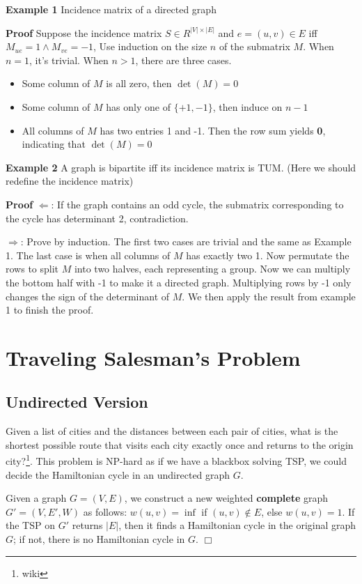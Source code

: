 \documentclass[11pt]{article}
\newenvironment{proof}{\vspace{-0.05in}\noindent{\bf Proof:}}%
        {\hspace*{\fill}$\Box$\par}
\begin{document}
    \textbf{Example 1} Incidence matrix of a directed graph 

    \textbf{Proof} Suppose the incidence matrix $S \in R ^{|V| \times |E|}$ and  $e = (u, v) \in E$ iff $M_{ue} = 1 \land M_{ve} = -1 $, Use induction on the size $n$ of the submatrix $M$. When $n = 1$, it's trivial. When $n > 1$, there are three cases.  
      \begin{itemize}
        \item Some column of $M$ is all zero, then $\det(M) = 0$
        \item Some column of $M$ has only one of $\{+1, -1\}$, then induce on $n - 1$
        \item All columns of $M$ has two entries 1 and -1. Then the row sum yields \textbf{0}, indicating that $\det(M) = 0$
      \end{itemize}

    \textbf{Example 2} A graph is bipartite iff its incidence matrix is TUM. (Here we should redefine the incidence matrix)

    \textbf{Proof} 
    $\Leftarrow$: If the graph contains an odd cycle, the submatrix corresponding to the cycle has determinant 2, contradiction.

    $\Rightarrow$: Prove by induction. The first two cases are trivial and the same as Example 1. The last case is when all columns of $M$ has exactly two 1. Now permutate the rows to split $M$ into two halves, each representing a group. Now we can multiply the bottom half with -1 to make it a directed graph. Multiplying rows by -1 only changes the sign of the determinant of $M$. We then apply the result from example 1 to finish the proof.

\section{Traveling Salesman's Problem}
  \subsection{Undirected Version}
    Given a list of cities and the distances between each pair of cities, what is the shortest possible route that visits each city exactly once and returns to the origin city?\footnote{wiki}. This problem is NP-hard as if we have a blackbox solving TSP, we could decide the Hamiltonian cycle in an undirected graph $G$. 
    
    \begin{proof}
      Given a graph $G = (V, E)$, we construct a new weighted \textbf{complete} graph $G' = (V, E', W)$ as follows: 
      $w(u, v) = \inf$ if $(u, v) \notin E$, else $w(u, v) = 1$. If the TSP on $G'$ returns $|E|$, then it finds a Hamiltonian cycle in the original graph $G$; if not, there is no Hamiltonian cycle in $G$.
    \end{proof}
\end{document}
